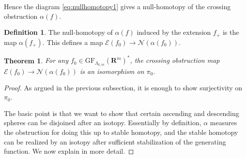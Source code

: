 \documentclass[12pt,a4paper]{article}
\numberwithin{equation}{section}
\newtheorem{theorem}[equation]{Theorem}
\theoremstyle{definition}
\newtheorem{dfn}[equation]{Definition}
\theoremstyle{remark}
\newcommand{\E}{\mathcal{E}}
\newcommand{\R}{\mathbf{R}}
\newcommand{\NN}{\mathcal{N}}
\newcommand{\GF}{\mathrm{GF}}
\begin{document}
Hence the diagram \eqref{eq:nullhomotopy1} gives a null-homotopy of
the crossing obstruction $\alpha(f)$.

\begin{dfn}
The null-homotopy of $\alpha(f)$ induced by the extension $f_+$ is the map $\alpha(f_+)$.
This defines a map $\E(f_0)\to \NN(\alpha(f_0))$.
\end{dfn}

\begin{theorem} \label{thm:gfcrossing}
For any $f_0\in \GF_{\Lambda_{k,m}}(\R^m)^*$, the crossing obstruction map $\E(f_0)\to \NN(\alpha(f_0))$ is an isomorphism on $\pi_0$.
\end{theorem}
\begin{proof}
As argued in the previous subsection, it is enough to show surjectivity on $\pi_0$.

    The basic point is that
    we want to show that certain ascending and descending spheres can be disjoined after an isotopy.  Essentially by definition,
    $\alpha$ measures the obstruction for doing this up to stable homotopy, and the stable homotopy can be realized by an isotopy after sufficient stabilization of the generating function.  We now explain in more detail.


\end{proof}
\end{document}
